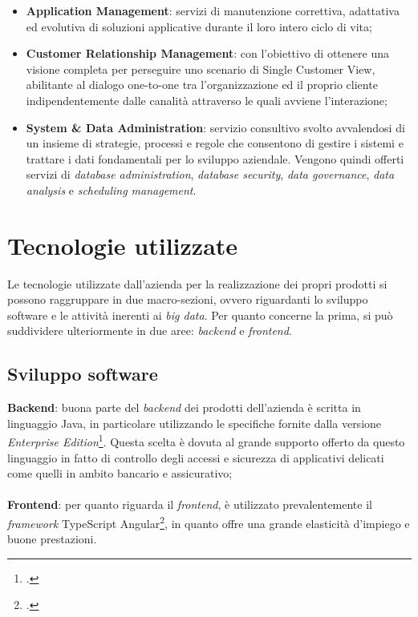 \begin{itemize}
	\item \textbf{Application Management}: servizi di manutenzione correttiva, adattativa ed evolutiva di soluzioni applicative durante il loro intero ciclo di vita;
	\item \textbf{Customer Relationship Management}: con l'obiettivo di ottenere una visione completa per perseguire uno scenario di \gls{Single Customer View}, abilitante al dialogo one-to-one tra l'organizzazione ed il proprio cliente indipendentemente dalle canalità attraverso le quali avviene l'interazione;
	\item \textbf{System \& Data Administration}: servizio consultivo svolto avvalendosi di un insieme di strategie, processi e regole che consentono di gestire i sistemi e trattare i dati fondamentali per lo sviluppo aziendale. Vengono quindi offerti servizi di \textit{database administration}, \textit{database security}, \textit{data governance}, \textit{data analysis} e \textit{scheduling management}.
\end{itemize}

\section{Tecnologie utilizzate}

Le tecnologie utilizzate dall’azienda per la realizzazione dei propri prodotti si possono raggruppare in due macro-sezioni, ovvero riguardanti lo sviluppo software e le attività inerenti ai \textit{big data}.
Per quanto concerne la prima, si può suddividere ulteriormente in due aree: \textit{backend} e \textit{frontend}.

\subsection{Sviluppo software}
\textbf{Backend}: buona parte del \textit{backend} dei prodotti dell'azienda è scritta in linguaggio Java, in particolare utilizzando le specifiche fornite dalla versione \textit{Enterprise Edition}\footcite{https://www.oracle.com/technetwork/java/javaee}. Questa scelta è dovuta al grande supporto offerto da questo linguaggio in fatto di controllo degli accessi e sicurezza di applicativi delicati come quelli in ambito bancario e assicurativo;\\\\
\textbf{Frontend}: per quanto riguarda il \textit{frontend}, è utilizzato prevalentemente il \textit{framework} TypeScript Angular\footcite{https://angular.io/}, in quanto offre una grande elasticità d'impiego e buone prestazioni. \\

